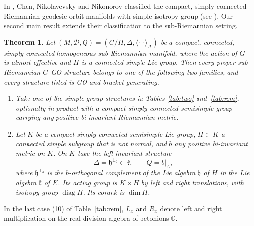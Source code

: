 \documentclass[12pt]{amsart}
\theoremstyle{plain}
\newtheorem{theorem}{Theorem}[section]
\theoremstyle{definition}
\theoremstyle{remark}
\newcommand{\OO}{\mathbb{O}}
\newcommand{\diag}{\operatorname{diag}}
\begin{document}
In \cite{ChenNN}, Chen, Nikolayevsky and Nikonorov classified the compact, simply connected
Riemannian geodesic orbit manifolds with simple isotropy group (see \cite[Thms.~1--2]{ChenNN}).
Our second main result extends their classification to the sub-Riemannian setting.


\begin{theorem}\label{thm:main}
Let $(M,\mathcal{D},Q)=(G/H,\Delta,\langle\cdot,\cdot\rangle_\Delta)$ be a compact, connected,
simply connected homogeneous sub-Riemannian manifold, where the action of $G$ is almost effective
and $H$ is a connected simple Lie group. Then every proper sub-Riemannian $G$-GO structure
belongs to one of the following two families, and every structure listed is GO and bracket
generating.
\begin{enumerate}\renewcommand{\labelenumi}{\upshape(\Alph{enumi})}
\item Take one of the simple-group structures in Tables~\ref{tab:two} and~\ref{tab:rem},
optionally in product with a compact simply connected semisimple group carrying any positive
bi-invariant Riemannian metric.
\item Let $K$ be a compact simply connected semisimple Lie group, $H\subset K$ a connected simple
subgroup that is not normal, and $b$ any positive bi-invariant metric on $K$. On $K$ take the
left-invariant structure
\[ \Delta=\mathfrak{h}^{\perp_b}\subset\mathfrak{k},\qquad Q=b|_{\Delta}, \]
where $\mathfrak{h}^{\perp_b}$ is the $b$-orthogonal complement of the Lie algebra $\mathfrak{h}$
of $H$ in the Lie algebra $\mathfrak{k}$ of $K$. Its acting group is $K\times H$ by left and right
translations, with isotropy group $\diag H$. Its corank is $\dim H$.
\end{enumerate}
\end{theorem}


In the last case (10) of Table~\ref{tab:rem}, $L_x$ and $R_x$ denote left and right multiplication
on the real division algebra  of octonions $\OO$.
\end{document}
